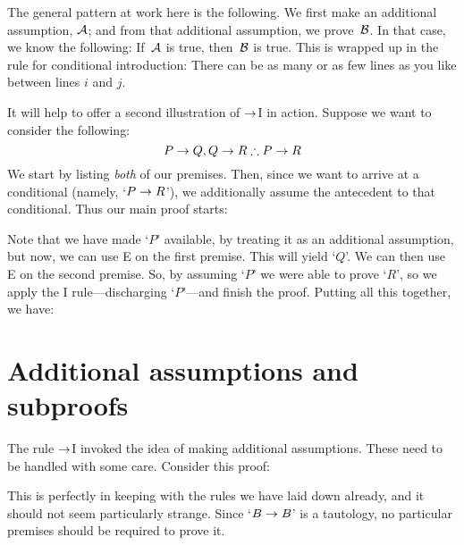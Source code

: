 The general pattern at work here is the following. We first make an additional assumption, $\mathcal{A}$; and from that additional assumption, we prove~$\mathcal{B}$. In that case, we know the following: If~$\mathcal{A}$ is true, then~$\mathcal{B}$ is true. This is wrapped up in the rule for conditional introduction:
There can be as many or as few lines as you like between lines $i$ and $j$. 

It will help to offer a second  illustration of $\rightarrow$I in action. Suppose we want to consider the following:
	$$P \eif Q, Q \eif R \therefore P \eif R$$
We start by listing \emph{both} of our premises. Then, since we want to arrive at a conditional (namely, `$P \rightarrow R$'), we additionally assume the antecedent to that conditional. Thus our main proof starts:
\begin{fitchproof}
	\open
	\close
\end{fitchproof}
Note that we have made `$P$' available, by treating it as an additional assumption, but now, we can use {\eif}E on the first premise. This will yield `$Q$'. We can then use {\eif}E on the second premise. So, by assuming `$P$' we were able to prove `$R$', so we apply the {\eif}I rule---discharging `$P$'---and finish the proof. Putting all this together, we have:
\label{HSproof}
\begin{fitchproof}
	\open
	\close
\end{fitchproof}


\section{Additional assumptions and subproofs}
The rule $\rightarrow$I invoked the idea of making additional assumptions. These need to be handled with some care. Consider this proof:
\begin{fitchproof}
	\open
		 
	\close
\end{fitchproof}
This is perfectly in keeping with the rules we have laid down already, and it should not seem particularly strange. Since `$B \rightarrow B$' is a tautology, no particular premises should be required to prove it. 

